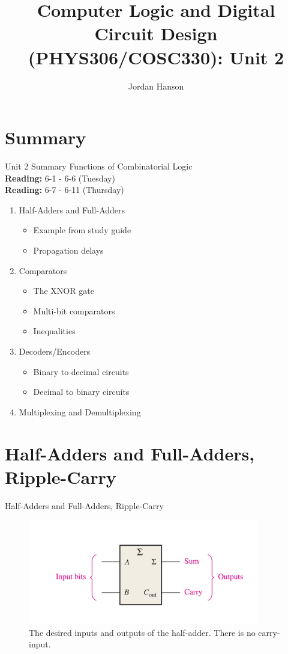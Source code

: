 \documentclass{beamer}
\title{Computer Logic and Digital Circuit Design (PHYS306/COSC330): Unit 2}
\author{Jordan Hanson}
\institute{Whittier College Department of Physics and Astronomy}
\begin{document}
\maketitle

\section{Summary}

\begin{frame}{Unit 2 Summary}
\alert{Functions of Combinatorial Logic} \\
\textbf{Reading:} 6-1 - 6-6 (Tuesday) \\
\textbf{Reading:} 6-7 - 6-11 (Thursday)
\begin{enumerate}
\item Half-Adders and Full-Adders
\begin{itemize}
\item Example from study guide
\item Propagation delays
\end{itemize}
\item Comparators
\begin{itemize}
\item The XNOR gate
\item Multi-bit comparators
\item Inequalities
\end{itemize}
\item Decoders/Encoders
\begin{itemize}
\item Binary to decimal circuits
\item Decimal to binary circuits
\end{itemize}
\item Multiplexing and Demultiplexing
\end{enumerate}
\end{frame}

\section{Half-Adders and Full-Adders, Ripple-Carry}

\begin{frame}{Half-Adders and Full-Adders, Ripple-Carry}
\begin{figure}
\centering
\includegraphics[width=0.9\textwidth]{figures/adder1.pdf}
\caption{\label{fig:add1} The desired inputs and outputs of the half-adder.  There is no carry-input.}
\end{figure}
\end{frame}
\end{document}
